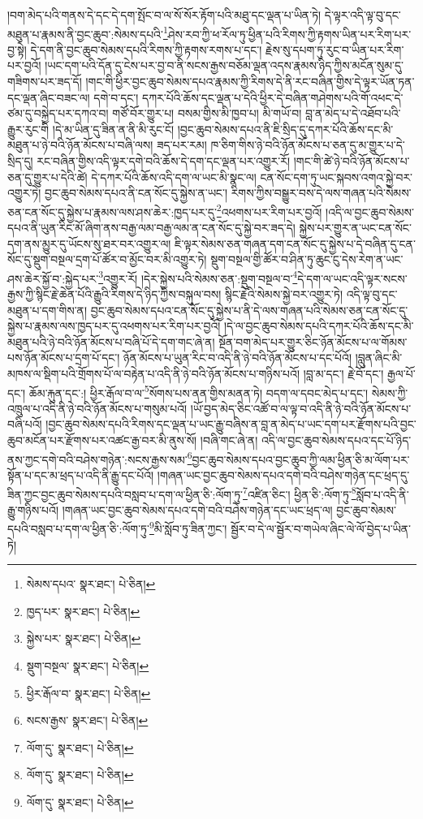 །བག་མེད་པའི་གནས་དེ་དང་དེ་དག་སྤོང་བ་ལ་སོ་སོར་རྟོག་པའི་མཐུ་དང་ལྡན་པ་ཡིན་ཏེ། དེ་ལྟར་འདི་ལྟ་བུ་དང་མཐུན་པ་རྣམས་ནི་བྱང་ཆུབ་:སེམས་དཔའི་\footnote{སེམས་དཔའ་  སྣར་ཐང་།  པེ་ཅིན། }ཤེས་རབ་ཀྱི་ཕ་རོལ་ཏུ་ཕྱིན་པའི་རིགས་ཀྱི་རྟགས་ཡིན་པར་རིག་པར་བྱ་སྟེ། དེ་དག་ནི་བྱང་ཆུབ་སེམས་དཔའི་རིགས་ཀྱི་རྟགས་རགས་པ་དང་། རྗེས་སུ་དཔག་ཏུ་རུང་བ་ཡིན་པར་རིག་པར་བྱའོ། །ཡང་དག་པའི་དོན་དུ་ངེས་པར་བྱ་བ་ནི་སངས་རྒྱས་བཅོམ་ལྡན་འདས་རྣམས་ཉིད་ཀྱིས་མངོན་སུམ་དུ་གཟིགས་པར་ཟད་དོ། །གང་གི་ཕྱིར་བྱང་ཆུབ་སེམས་དཔའ་རྣམས་ཀྱི་རིགས་དེ་ནི་རང་བཞིན་གྱིས་དེ་ལྟར་ཡོན་ཏན་དང་ལྡན་ཞིང་བཟང་ལ། དགེ་བ་དང་། དཀར་པོའི་ཆོས་དང་ལྡན་པ་དེའི་ཕྱིར་དེ་བཞིན་གཤེགས་པའི་གོ་འཕང་དེ་ཙམ་དུ་བསྐྱེད་པར་དཀའ་བ། གཙོ་བོར་གྱུར་པ། བསམ་གྱིས་མི་ཁྱབ་པ། མི་གཡོ་བ། བླ་ན་མེད་པ་དེ་འཐོབ་པའི་རྒྱུར་རུང་གི །དེ་མ་ཡིན་དུ་ཟིན་ན་ནི་མི་རུང་ངོ། །བྱང་ཆུབ་སེམས་དཔའ་ནི་ཇི་སྲིད་དུ་དཀར་པོའི་ཆོས་དང་མི་མཐུན་པ་ཉེ་བའི་ཉོན་མོངས་པ་བཞི་ལས། ཟད་པར་རམ། ཁ་ཅིག་གིས་ཉེ་བའི་ཉོན་མོངས་པ་ཅན་དུ་མ་གྱུར་པ་དེ་སྲིད་དུ། རང་བཞིན་གྱིས་འདི་ལྟར་དགེ་བའི་ཆོས་དེ་དག་དང་ལྡན་པར་འགྱུར་རོ། །གང་གི་ཚེ་ཉེ་བའི་ཉོན་མོངས་པ་ཅན་དུ་གྱུར་པ་དེའི་ཚེ། དེ་དཀར་པོའི་ཆོས་འདི་དག་ལ་ཡང་མི་སྣང་ལ། ངན་སོང་དག་ཏུ་ཡང་སྐབས་འགའ་སྐྱེ་བར་འགྱུར་ཏེ། བྱང་ཆུབ་སེམས་དཔའ་ནི་ངན་སོང་དུ་སྐྱེས་ན་ཡང་། རིགས་ཀྱིས་བསྒྱུར་བས་དེ་ལས་གཞན་པའི་སེམས་ཅན་ངན་སོང་དུ་སྐྱེས་པ་རྣམས་ལས་ཤས་ཆེར་:ཁྱད་པར་དུ་\footnote{ཁྱད་པར་  སྣར་ཐང་།  པེ་ཅིན། }འཕགས་པར་རིག་པར་བྱའོ། །འདི་ལ་བྱང་ཆུབ་སེམས་དཔའ་ནི་ཡུན་རིང་མོ་ཞིག་ནས་བརྒྱ་ལམ་བརྒྱ་ལམ་ན་ངན་སོང་དུ་སྐྱེ་བར་ཟད་དེ། སྐྱེས་པར་གྱུར་ན་ཡང་ངན་སོང་དག་ནས་མྱུར་དུ་ཡོངས་སུ་ཐར་བར་འགྱུར་ལ། ཇི་ལྟར་སེམས་ཅན་གཞན་དག་ངན་སོང་དུ་སྐྱེས་པ་དེ་བཞིན་དུ་ངན་སོང་དུ་སྡུག་བསྔལ་དྲག་པོ་ཚོར་བ་མྱོང་བར་མི་འགྱུར་ཏེ། སྡུག་བསྔལ་གྱི་ཚོར་བ་ཤིན་ཏུ་ཆུང་ངུ་དེས་རེག་ན་ཡང་ཤས་ཆེར་སྐྱོ་བ་:སྐྱེད་པར་\footnote{སྐྱེས་པར་  སྣར་ཐང་།  པེ་ཅིན། }འགྱུར་རོ། །དེར་སྐྱེས་པའི་སེམས་ཅན་:སྡུག་བསྔལ་བ་\footnote{སྡུག་བསྔལ་  སྣར་ཐང་།  པེ་ཅིན། }དེ་དག་ལ་ཡང་འདི་ལྟར་སངས་རྒྱས་ཀྱི་སྙིང་རྗེ་ཆེན་པོའི་རྒྱུའི་རིགས་དེ་ཉིད་ཀྱིས་བསྐུལ་བས། སྙིང་རྗེའི་སེམས་སྐྱེ་བར་འགྱུར་ཏེ། འདི་ལྟ་བུ་དང་མཐུན་པ་དག་གིས་ན། བྱང་ཆུབ་སེམས་དཔའ་ངན་སོང་དུ་སྐྱེས་པ་ནི་དེ་ལས་གཞན་པའི་སེམས་ཅན་ངན་སོང་དུ་སྐྱེས་པ་རྣམས་ལས་ཁྱད་པར་དུ་འཕགས་པར་རིག་པར་བྱའོ། །དེ་ལ་བྱང་ཆུབ་སེམས་དཔའི་དཀར་པོའི་ཆོས་དང་མི་མཐུན་པའི་ཉེ་བའི་ཉོན་མོངས་པ་བཞི་པོ་དེ་དག་གང་ཞེ་ན། སྔོན་བག་མེད་པར་གྱུར་ཅིང་ཉོན་མོངས་པ་ལ་གོམས་པས་ཉོན་མོངས་པ་དྲག་པོ་དང་། ཉོན་མོངས་པ་ཡུན་རིང་བ་འདི་ནི་ཉེ་བའི་ཉོན་མོངས་པ་དང་པོའོ། །བླུན་ཞིང་མི་མཁས་ལ་སྡིག་པའི་གྲོགས་པོ་ལ་བརྟེན་པ་འདི་ནི་ཉེ་བའི་ཉོན་མོངས་པ་གཉིས་པའོ། །བླ་མ་དང་། རྗེ་བོ་དང་། རྒྱལ་པོ་དང་། ཆོམ་རྐུན་དང་:། ཕྱིར་རྒོལ་བ་ལ་\footnote{ཕྱིར་རྒོལ་བ་  སྣར་ཐང་།  པེ་ཅིན། }སོགས་པས་ནན་གྱིས་མནན་ཏེ། བདག་ལ་དབང་མེད་པ་དང་། སེམས་ཀྱི་འཁྲུལ་པ་འདི་ནི་ཉེ་བའི་ཉོན་མོངས་པ་གསུམ་པའོ། །ཡོ་བྱད་མེད་ཅིང་འཚོ་བ་ལ་ལྟ་བ་འདི་ནི་ཉེ་བའི་ཉོན་མོངས་པ་བཞི་པའོ། །བྱང་ཆུབ་སེམས་དཔའི་རིགས་དང་ལྡན་པ་ཡང་རྒྱུ་བཞིས་ན་བླ་ན་མེད་པ་ཡང་དག་པར་རྫོགས་པའི་བྱང་ཆུབ་མངོན་པར་རྫོགས་པར་འཚང་རྒྱ་བར་མི་ནུས་སོ། །བཞི་གང་ཞེ་ན། འདི་ལ་བྱང་ཆུབ་སེམས་དཔའ་དང་པོ་ཉིད་ནས་ཀྱང་དགེ་བའི་བཤེས་གཉེན་:སངས་རྒྱས་སམ་\footnote{སངས་རྒྱས་  སྣར་ཐང་།  པེ་ཅིན། }བྱང་ཆུབ་སེམས་དཔའ་བྱང་ཆུབ་ཀྱི་ལམ་ཕྱིན་ཅི་མ་ལོག་པར་སྟོན་པ་དང་མ་ཕྲད་པ་འདི་ནི་རྒྱུ་དང་པོའོ། །གཞན་ཡང་བྱང་ཆུབ་སེམས་དཔའ་དགེ་བའི་བཤེས་གཉེན་དང་ཕྲད་དུ་ཟིན་ཀྱང་བྱང་ཆུབ་སེམས་དཔའི་བསླབ་པ་དག་ལ་ཕྱིན་ཅི་:ལོག་ཏུ་\footnote{ལོག་དུ་  སྣར་ཐང་།  པེ་ཅིན། }འཛིན་ཅིང་། ཕྱིན་ཅི་:ལོག་ཏུ་\footnote{ལོག་དུ་  སྣར་ཐང་།  པེ་ཅིན། }སློབ་པ་འདི་ནི་རྒྱུ་གཉིས་པའོ། །གཞན་ཡང་བྱང་ཆུབ་སེམས་དཔའ་དགེ་བའི་བཤེས་གཉེན་དང་ཡང་ཕྲད་ལ། བྱང་ཆུབ་སེམས་དཔའི་བསླབ་པ་དག་ལ་ཕྱིན་ཅི་:ལོག་ཏུ་\footnote{ལོག་དུ་  སྣར་ཐང་།  པེ་ཅིན། }མི་སློབ་ཏུ་ཟིན་ཀྱང་། སྦྱོར་བ་དེ་ལ་སྦྱོར་བ་གཡེལ་ཞིང་ལེ་ལོ་བྱེད་པ་ཡིན་ཏེ། 